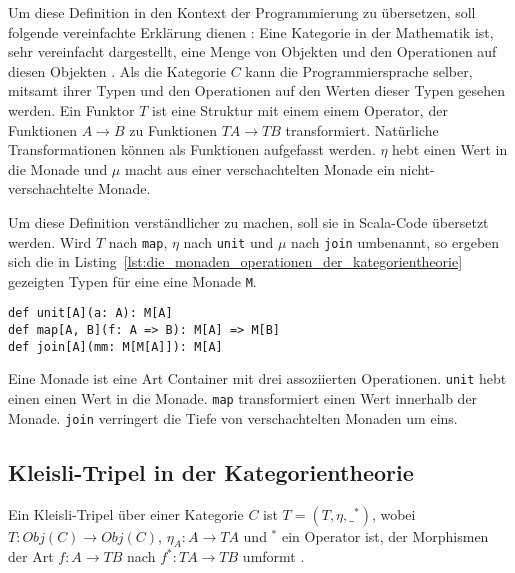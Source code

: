 Um diese Definition in den Kontext der Programmierung zu übersetzen, soll folgende vereinfachte Erklärung dienen \cite[vgl.][S.~2--3]{monads_programming}:
Eine Kategorie in der Mathematik ist, sehr vereinfacht dargestellt, eine Menge von Objekten und den Operationen auf diesen Objekten \cite[vgl.][S.~7]{monads_category_theory}.
Als die Kategorie $C$ kann die Programmiersprache selber, mitsamt ihrer Typen und den Operationen auf den Werten dieser Typen gesehen werden\cite[vgl.][S.~6--8]{category_theory_and_programming}.
Ein Funktor $T$ ist eine Struktur mit einem einem Operator, der Funktionen $A \to B$ zu Funktionen $T A \to T B$ transformiert.
Natürliche Transformationen können als Funktionen aufgefasst werden.
$\eta$ hebt einen Wert in die Monade und $\mu$ macht aus einer verschachtelten Monade ein nicht-verschachtelte Monade.

Um diese Definition verständlicher zu machen, soll sie in Scala-Code übersetzt werden.
Wird $T$ nach \lstinline|map|, $\eta$ nach \lstinline|unit| und $\mu$ nach \lstinline|join| umbenannt, so ergeben sich die in Listing~\ref{lst:die_monaden_operationen_der_kategorientheorie} gezeigten Typen für eine eine Monade \lstinline|M|.

\begin{lstlisting}[caption=Die Monaden-Operationen der Kategorientheorie, label=lst:die_monaden_operationen_der_kategorientheorie]
def unit[A](a: A): M[A]
def map[A, B](f: A => B): M[A] => M[B]
def join[A](mm: M[M[A]]): M[A]
\end{lstlisting}

Eine Monade ist eine Art Container mit drei assoziierten Operationen.
\lstinline|unit| hebt einen einen Wert in die Monade.
\lstinline|map| transformiert einen Wert innerhalb der Monade.
\lstinline|join| verringert die Tiefe von verschachtelten Monaden um eins.


\subsection{Kleisli-Tripel in der Kategorientheorie} %
\label{sub:kleisli_tripel_in_der_kategorientheorie}

Ein Kleisli-Tripel über einer Kategorie $C$ ist $T = (T, \eta, \_^*)$, wobei $T: Obj(C) \to Obj(C)$, $\eta_A: A \to T A$ und $^*$ ein Operator ist, der Morphismen der Art $f: A \to T B$ nach $f^*: T A \to T B$ umformt \cite[vgl.][S.~2]{monads_program_structure}.

